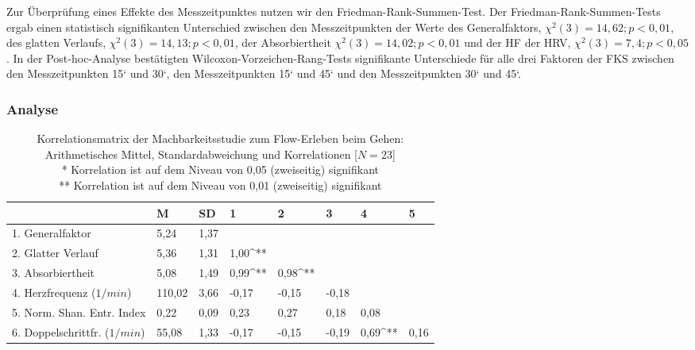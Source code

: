 Zur Überprüfung eines Effekte des Messzeitpunktes nutzen wir den Friedman-Rank-Summen-Test. Der Friedman-Rank-Summen-Tests ergab einen statistisch signifikanten Unterschied zwischen den Messzeitpunkten der Werte des Generalfaktors, $\chi^2 (3) = 14{,}62; p < 0{,}01$, des glatten Verlaufs, $\chi^2 (3) = 14{,}13; p < 0{,}01$, der Absorbiertheit $\chi^2 (3) = 14{,}02; p < 0{,}01$ und der \ac{HF} der \ac{HRV}, $\chi^2 (3) = 7{,}4; p < 0{,}05$. In der Post-hoc-Analyse bestätigten Wilcoxon-Vorzeichen-Rang-Tests signifikante Unterschiede für alle drei Faktoren der \ac{FKS} zwischen den Messzeitpunkten 15‘ und 30‘, den Messzeitpunkten 15‘ und 45‘ und den Messzeitpunkten 30‘ und 45‘. 

\subsubsection{Analyse} 

\label{subs:analyse_5_2}
\begin{sidewaystable}
	\centering \caption[Korrelationsmatrix (Machbarkeitsstudie: Gehen)]{Korrelationsmatrix der Machbarkeitsstudie zum Flow-Erleben beim Gehen: Arithmetisches Mittel, Standardabweichung und Korrelationen [$N = 23$]\\
	\hspace{ 
	\textwidth}* Korrelation ist auf dem Niveau von 0,05 (zweiseitig) signifikant \\
	\hspace{ 
	\textwidth}** Korrelation ist auf dem Niveau von 0,01 (zweiseitig) signifikant} \label{tab:korrelationen_2} 
	\begin{tabular}
		{lxxxxxxx} \toprule & M & SD & 1 & 2 & 3 & 4 & 5 \\
		. Generalfaktor & 5,24 & 1,37 & & & & & \\
		2. Glatter Verlauf & 5,36 & 1,31 & 1,00^{**} & & & & \\
		3. Absorbiertheit & 5,08 & 1,49 & 0,99^{**} & 0,98^{**} & & & \\
		4. Herzfrequenz ($1/min$) & 110,02 & 3,66 & -0,17 & -0,15 & -0,18 & & \\
		5. Norm. Shan. Entr. Index & 0,22 & 0,09 & 0,23 & 0,27 & 0,18 & 0,08 & \\
		6. Doppelschrittfr. ($1/min$) & 55,08 & 1,33 & -0,17 & -0,15 & -0,19 & 0,69^{**} & 0,16 \\
		\bottomrule 
	\end{tabular}
\end{sidewaystable}

